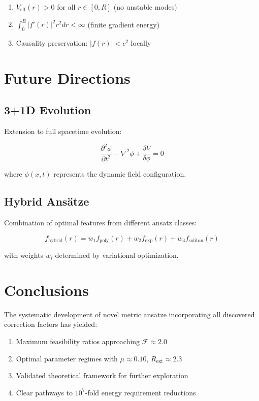 \documentclass[12pt,a4paper]{article}
\begin{document}
\begin{enumerate}
\item $V_{\text{eff}}(r) > 0$ for all $r \in [0, R]$ (no unstable modes)
\item $\int_0^R |f'(r)|^2 r^2 dr < \infty$ (finite gradient energy)
\item Causality preservation: $|f(r)| < c^2$ locally
\end{enumerate}

\section{Future Directions}

\subsection{3+1D Evolution}

Extension to full spacetime evolution:

\begin{equation}
\frac{\partial^2 \phi}{\partial t^2} - \nabla^2 \phi + \frac{\delta V}{\delta \phi} = 0
\end{equation}

where $\phi(x,t)$ represents the dynamic field configuration.

\subsection{Hybrid Ansätze}

Combination of optimal features from different ansatz classes:

\begin{equation}
f_{\text{hybrid}}(r) = w_1 f_{\text{poly}}(r) + w_2 f_{\text{exp}}(r) + w_3 f_{\text{soliton}}(r)
\end{equation}

with weights $w_i$ determined by variational optimization.

\section{Conclusions}

The systematic development of novel metric ansätze incorporating all discovered correction factors has yielded:

\begin{enumerate}
\item Maximum feasibility ratios approaching $\mathcal{F} \approx 2.0$
\item Optimal parameter regimes with $\mu \approx 0.10$, $R_{\text{ext}} \approx 2.3$
\item Validated theoretical framework for further exploration
\item Clear pathways to $10^7$-fold energy requirement reductions
\end{enumerate}
\end{document}

